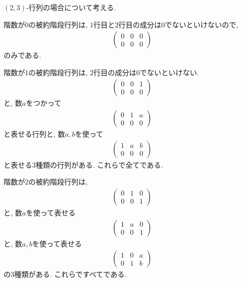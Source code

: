 \begin{example}
  $(2,3)$-行列の場合について考える.

  階数が$0$の被約階段行列は,
  $1$行目と$2$行目の成分は$0$でないといけないので,
  \begin{align*}
    \begin{pmatrix}
      0&0&0\\0&0&0
    \end{pmatrix}
  \end{align*}
  のみである.
  
  階数が$1$の被約階段行列は,
  $2$行目の成分は$0$でないといけない.
  \begin{align*}
    \begin{pmatrix}
      0&0&1\\0&0&0
    \end{pmatrix}
  \end{align*}
  と, 数$a$をつかって
  \begin{align*}
    \begin{pmatrix}
      0&1&a\\0&0&0
    \end{pmatrix}
  \end{align*}
  と表せる行列と, 数$a,b$を使って
  \begin{align*}
    \begin{pmatrix}
      1&a&b\\0&0&0
    \end{pmatrix}
  \end{align*}
  と表せる$3$種類の行列がある.
  これらで全てである.

  階数が$2$の被約階段行列は,
  \begin{align*}
    \begin{pmatrix}
     0& 1&0\\0&0&1
    \end{pmatrix}
  \end{align*}
  と,
  数$a$を使って表せる
  \begin{align*}
    \begin{pmatrix}
      1&a&0\\0&0&1
    \end{pmatrix}
  \end{align*}
  と, 数$a,b$を使って表せる
  \begin{align*}
    \begin{pmatrix}
      1&0&a\\0&1&b
    \end{pmatrix}
  \end{align*}
  の$3$種類がある. これらですべてである.
\end{example}


